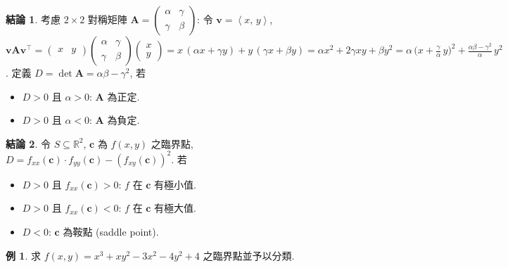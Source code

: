 \documentclass[12pt]{extarticle}
\newcommand{\ds}{\displaystyle}
\newcommand{\llt}{\left\langle}
\newcommand{\rgt}{\right\rangle}
\theoremstyle{definition}
\newtheorem*{fact}{結論}
\newtheorem*{ex}{例}
\newcommand{\vv}{\mathbf{v}}
\newcommand{\vc}{\mathbf{c}}
\newcommand{\vA}{\mathbf{A}}
\begin{document}
\begin{fact}
  考慮 $2\times 2$ 對稱矩陣 $\ds\vA = \begin{pmatrix}\alpha & \gamma\\ \gamma & \beta\end{pmatrix}$: 令 $\ds\vv = \llt x,\,y\rgt$, $\ds\vv\vA\vv^\top = \begin{pmatrix}x & y\end{pmatrix}\begin{pmatrix}\alpha & \gamma\\ \gamma & \beta\end{pmatrix}\begin{pmatrix}x\\y\end{pmatrix} = x\,(\alpha x + \gamma y) + y\,(\gamma x + \beta y) = \alpha x^2 + 2\gamma xy + \beta y^2 = \alpha\,\Big(x + \frac{\gamma}{\alpha}\,y\Big)^2 + \frac{\alpha\beta - \gamma^2}{\alpha}\,y^2$. 定義 $\ds D = \det{\vA} = \alpha\beta - \gamma^2$, 若
  \setlength{\columnsep}{10mm}
  \begin{multicols}{2}
    \begin{itemize}\setlength\itemsep{0em}
      \item $\ds D > 0$ 且 $\ds\alpha > 0$: $\vA$ 為正定. 
      \item $\ds D > 0$ 且 $\ds\alpha < 0$: $\vA$ 為負定. 
    \end{itemize}
  \end{multicols}
\end{fact}

\begin{fact}
  令 $\ds S\subseteq\mathbb{R}^2$, $\vc$ 為 $f(x, y)$ 之臨界點, $\ds D = f_{xx}(\vc)\cdot f_{yy}(\vc) - (f_{xy}(\vc))^2$. 若
  \setlength{\columnsep}{10mm}
  \begin{multicols}{2}
    \begin{itemize}\setlength\itemsep{0em}
      \item $D > 0$ 且 $\ds f_{xx}(\vc) > 0$: $f$ 在 $\vc$ 有極小值. 
      \item $D > 0$ 且 $\ds f_{xx}(\vc) < 0$: $f$ 在 $\vc$ 有極大值. 
      \item $D < 0$: $\vc$ 為鞍點 (saddle point). 
    \end{itemize}
  \end{multicols}
\end{fact}

\begin{ex} 
  求 $\ds f(x, y) = x^3 + xy^2 - 3x^2 - 4y^2 + 4$ 之臨界點並予以分類. 
\end{ex}
\end{document}
